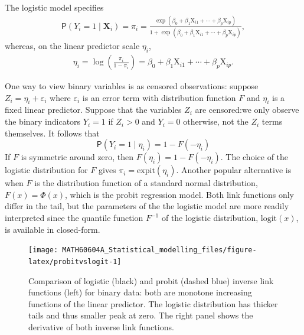 \documentclass[
  11pt,
  letterpaper,
]{book}
\theoremstyle{definition}
\theoremstyle{definition}
\theoremstyle{definition}
\theoremstyle{remark}
\begin{document}
The logistic model specifies
\begin{align*}
\mathsf{P}(Y_i=1 \mid \mathbf{X}_i) = \pi_i = \frac{\exp(\beta_0 + \beta_1 \mathrm{X}_{i1}+ \cdots + \beta_p\mathrm{X}_{ip})}{1 + \exp(\beta_0 + \beta_1 \mathrm{X}_{i1}+ \cdots + \beta_p\mathrm{X}_{ip})},
\end{align*}
whereas, on the linear predictor scale \(\eta_i\),
\begin{align*}
\eta_i =\log \left(\frac{\pi_i}{1-\pi_i}\right) =  \beta_0 + \beta_1 \mathrm{X}_{i1}+ \cdots + \beta_p\mathrm{X}_{ip}.
\end{align*}

One way to view binary variables is as censored observations: suppose \(Z_i = \eta_i + \varepsilon_i\) where \(\varepsilon_i\) is an error term with distribution function \(F\) and \(\eta_i\) is a fixed linear predictor. Suppose that the variables \(Z_i\) are censored:we only observe the binary indicators \(Y_i = 1\) if \(Z_i > 0\) and \(Y_i=0\) otherwise, not the \(Z_i\) terms themselves. It follows that
\[
\mathsf{P}(Y_i = 1 \mid \eta_i) = 1-F(-\eta_i)
\]
If \(F\) is symmetric around zero, then \(F(\eta_i) = 1-F(-\eta_i)\). The choice of the logistic distribution for \(F\) gives \(\pi_i = \mathrm{expit}(\eta_i)\). Another popular alternative is when \(F\) is the distribution function of a standard normal distribution, \(F(x) = \Phi(x)\), which is the probit regression model. Both link functions only differ in the tail, but the parameters of the the logistic model are more readily interpreted since the quantile function \(F^{-1}\) of the logistic distribution, \(\mathrm{logit}(x)\), is available in closed-form.

\begin{figure}

{\centering \texttt{[image: MATH60604A\_Statistical\_modelling\_files/figure-latex/probitvslogit-1]} 

}

\caption{Comparison of logistic (black) and probit (dashed blue) inverse link functions (left) for binary data: both are monotone increasing functions of the linear predictor. The logistic distribution has thicker tails and thus smaller peak at zero. The right panel shows the derivative of both inverse link functions.}\label{fig:probitvslogit}
\end{figure}
\end{document}
